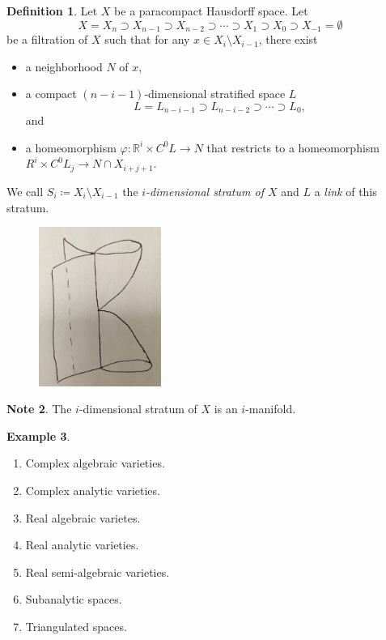 \documentclass[10pt,letterpaper,cm]{nupset}
\theoremstyle{definition}
\newtheorem{definition}{Definition}[subsection]
\newtheorem{exmp}[definition]{Example}
\newtheorem{note}[definition]{Note}
\theoremstyle{theorem}
\theoremstyle{remark}
\newcommand{\R}{\mathbb{R}}
\newcommand{\1}{\mathbb{1}}
\newcommand{\0}{\vec 0}
\begin{document}
\begin{definition}
Let $X$ be a paracompact Hausdorff space. Let $$ X= X_n \supset X_{n-1} \supset X_{n-2} \supset \cdots \supset X_1 \supset X_0 \supset X_{-1} = \emptyset  $$ be a filtration of $X$ such that for any $x\in X_i \setminus X_{i-1}$, there exist 
\begin{itemize}
\item a neighborhood $N$ of $x$,
\item a compact $(n-i-1)$-dimensional stratified space $L$ $$L = L_{n-i-1} \supset  L_{n-i-2} \supset \cdots \supset L_{0},$$ and
\item a homeomorphism $\varphi : \R^i \times C^0{L} \to N$ that restricts to a homeomorphism $R^i \times C^0{L_j}\to N \cap X_{i+j+1}$.  
\end{itemize}
We call $S_i\coloneqq  X_i \setminus X_{i-1}$ the \textit{$i$-dimensional stratum of $X$} and $L$ a \textit{link} of this stratum. 
\begin{figure}[H]
\centering
\includegraphics[width=40mm]{stratified.jpg}
\end{figure}
\end{definition}

\begin{note}
The $i$-dimensional stratum of $X$ is an $i$-manifold.
\end{note}

\begin{exmp} $ $
\begin{enumerate}
\item Complex algebraic varieties.
\item Complex analytic varieties.
\item Real algebraic varietes.
\item Real analytic varieties.
\item Real semi-algebraic varieties.
\item Subanalytic spaces.
\item Triangulated spaces.
\end{enumerate}
\end{exmp}
\end{document}
